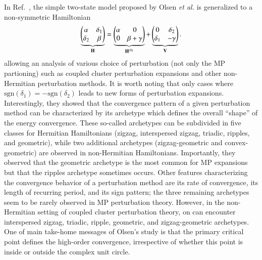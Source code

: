 \documentclass[aps,prb,reprint,noshowkeys,superscriptaddress]{revtex4-1}
\newcommand{\bH}{\mathbf{H}}
\newcommand{\bV}{\mathbf{V}}
\begin{document}
In Ref.~, the simple two-state model proposed by Olsen \textit{et al.} is generalized to a non-symmetric Hamiltonian 
\begin{equation}
	\underbrace{\mqty(\alpha & \delta_1 \\ \delta_2 & \beta)}_{\bH} = \underbrace{\mqty(\alpha & 0 \\ 0 & \beta + \gamma )}_{\bH^{(0)}} + \underbrace{\mqty( 0 & \delta_2 \\ \delta_1 & - \gamma)}_{\bV}.
\end{equation}
allowing an analysis of various choice of perturbation (not only the MP partioning) such as coupled cluster perturbation expansions \cite{Pawlowski_2019a,Pawlowski_2019b,Pawlowski_2019c,Pawlowski_2019d,Pawlowski_2019e} and other non-Hermitian perturbation methods.
It is worth noting that only cases where $\text{sgn}(\delta_1) = - \text{sgn}(\delta_2)$ leads to new forms of perturbation expansions.
Interestingly, they showed that the convergence pattern of a given perturbation method can be characterized by its archetype which defines the overall ``shape'' of the energy convergence. These so-called archetypes can be subdivided in five classes for Hermitian Hamiltonians (zigzag, interspersed zigzag, triadic, ripples, and geometric), while two additional archetypes (zigzag-geometric and convex-geometric) are observed in non-Hermitian Hamiltonians.
Importantly, they observed that the geometric archetype is the most common for MP expansions but that the ripples archetype sometimes occurs. \cite{Handy_1985,Lepetit_1988,Leininger_2000}
Other features characterizing the convergence behavior of a perturbation method are its rate of convergence, its length of recurring period, and its sign pattern;
the three remaining archetypes seem to be rarely observed in MP perturbation theory.
However, in the non-Hermitian setting of coupled cluster perturbation theory, \cite{Pawlowski_2019a,Pawlowski_2019b,Pawlowski_2019c,Pawlowski_2019d,Pawlowski_2019e} on can encounter interspersed zigzag, triadic, ripple, geometric, and zigzag-geometric archetypes.
One of main take-home messages of Olsen's study is that the primary critical point defines the high-order convergence, irrespective of whether this point is inside or outside the complex unit circle. \cite{Handy_1985,Olsen_2000}

\end{document}

